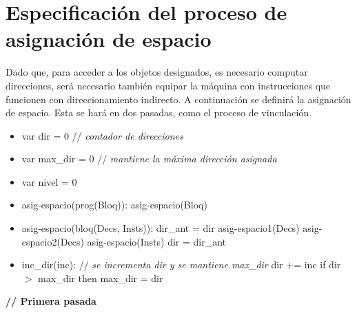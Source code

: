 \documentclass[11pt]{article}
\begin{document}
    \section{Especificación del proceso de asignación de espacio}

        Dado que, para acceder a los objetos designados, es necesario computar direcciones, será necesario también equipar la máquina con instrucciones que funcionen con direccionamiento indirecto. A continuación se definirá la asignación de espacio.
        Esta se hará en dos pasadas, como el proceso de vinculación. 

        \begin{itemize}
            \item var dir = 0 \/// \textit{contador de direcciones}
            \item var max\_dir = 0 \/// \textit{mantiene la máxima dirección asignada}
            \item var nivel = 0
            \item asig-espacio(prog(Bloq)): 
                \subitem asig-espacio(Bloq)
            \item asig-espacio(bloq(Decs, Insts)): 
                \subitem dir\_ant = dir
                \subitem asig-espacio1(Decs)
                \subitem asig-espacio2(Decs)
                \subitem asig-espacio(Insts)
                \subitem dir = dir\_ant
            \item inc\_dir(inc): \/// \textit{se incrementa dir y se mantiene max\_dir} 
                \subitem dir += inc
                \subitem if dir $>$ max\_dir then 
                    \subsubitem max\_dir = dir            
        \end{itemize}
        \textbf{\/// Primera pasada}
        
        
\end{document}
